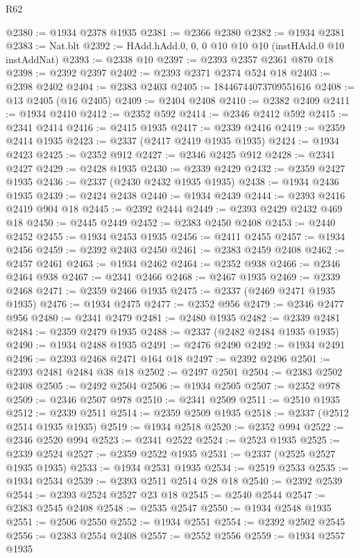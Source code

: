 \begin{lexlean}{R62}
\begin{coremodule}
@2380 := @1934 @2378 @1935
@2381 := @2366 @2380
@2382 := @1934 @2381
@2383 := Nat.blt
@2392 := HAdd.hAdd.{0, 0, 0} @10 @10 @10 (instHAdd.{0} @10 instAddNat)
@2393 := @2338 @10
@2397 := @2393 @2357 @2361 @870 @18
@2398 := @2392 @2397
@2402 := @2393 @2371 @2374 @524 @18
@2403 := @2398 @2402
@2404 := @2383 @2403
@2405 := 18446744073709551616
@2408 := @13 @2405 (@16 @2405)
@2409 := @2404 @2408
@2410 := @2382 @2409
@2411 := @1934 @2410
@2412 := @2352 @592
@2414 := @2346 @2412 @592
@2415 := @2341 @2414
@2416 := @2415 @1935
@2417 := @2339 @2416
@2419 := @2359 @2414 @1935
@2423 := @2337 (@2417 @2419 @1935 @1935)
@2424 := @1934 @2423
@2425 := @2352 @912
@2427 := @2346 @2425 @912
@2428 := @2341 @2427
@2429 := @2428 @1935
@2430 := @2339 @2429
@2432 := @2359 @2427 @1935
@2436 := @2337 (@2430 @2432 @1935 @1935)
@2438 := @1934 @2436 @1935
@2439 := @2424 @2438
@2440 := @1934 @2439
@2444 := @2393 @2416 @2419 @904 @18
@2445 := @2392 @2444
@2449 := @2393 @2429 @2432 @469 @18
@2450 := @2445 @2449
@2452 := @2383 @2450 @2408
@2453 := @2440 @2452
@2455 := @1934 @2453 @1935
@2456 := @2411 @2455
@2457 := @1934 @2456
@2459 := @2392 @2403 @2450
@2461 := @2383 @2459 @2408
@2462 := @2457 @2461
@2463 := @1934 @2462
@2464 := @2352 @938
@2466 := @2346 @2464 @938
@2467 := @2341 @2466
@2468 := @2467 @1935
@2469 := @2339 @2468
@2471 := @2359 @2466 @1935
@2475 := @2337 (@2469 @2471 @1935 @1935)
@2476 := @1934 @2475
@2477 := @2352 @956
@2479 := @2346 @2477 @956
@2480 := @2341 @2479
@2481 := @2480 @1935
@2482 := @2339 @2481
@2484 := @2359 @2479 @1935
@2488 := @2337 (@2482 @2484 @1935 @1935)
@2490 := @1934 @2488 @1935
@2491 := @2476 @2490
@2492 := @1934 @2491
@2496 := @2393 @2468 @2471 @164 @18
@2497 := @2392 @2496
@2501 := @2393 @2481 @2484 @38 @18
@2502 := @2497 @2501
@2504 := @2383 @2502 @2408
@2505 := @2492 @2504
@2506 := @1934 @2505
@2507 := @2352 @978
@2509 := @2346 @2507 @978
@2510 := @2341 @2509
@2511 := @2510 @1935
@2512 := @2339 @2511
@2514 := @2359 @2509 @1935
@2518 := @2337 (@2512 @2514 @1935 @1935)
@2519 := @1934 @2518
@2520 := @2352 @994
@2522 := @2346 @2520 @994
@2523 := @2341 @2522
@2524 := @2523 @1935
@2525 := @2339 @2524
@2527 := @2359 @2522 @1935
@2531 := @2337 (@2525 @2527 @1935 @1935)
@2533 := @1934 @2531 @1935
@2534 := @2519 @2533
@2535 := @1934 @2534
@2539 := @2393 @2511 @2514 @28 @18
@2540 := @2392 @2539
@2544 := @2393 @2524 @2527 @23 @18
@2545 := @2540 @2544
@2547 := @2383 @2545 @2408
@2548 := @2535 @2547
@2550 := @1934 @2548 @1935
@2551 := @2506 @2550
@2552 := @1934 @2551
@2554 := @2392 @2502 @2545
@2556 := @2383 @2554 @2408
@2557 := @2552 @2556
@2559 := @1934 @2557 @1935

\end{coremodule}
\end{lexlean}
